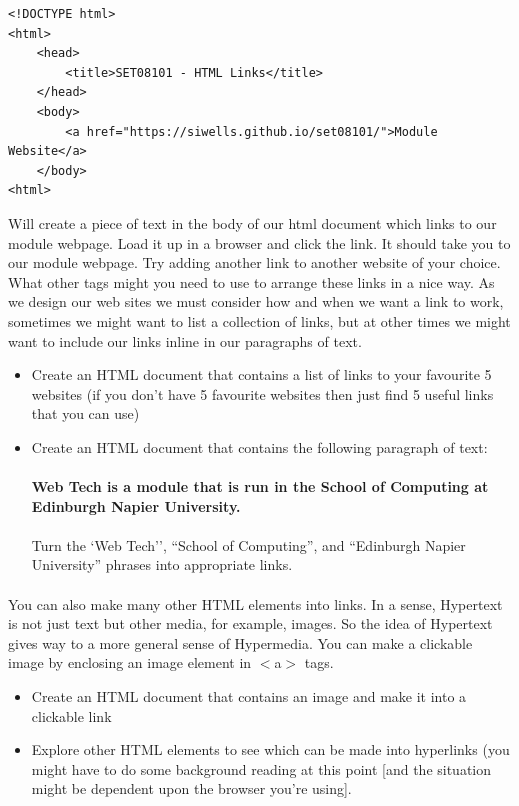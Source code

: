 \documentclass[10pt, a4paper, twosize]{article}
\begin{document}
\begin{lstlisting}
<!DOCTYPE html>
<html>
    <head>
        <title>SET08101 - HTML Links</title>
    </head>
    <body>
        <a href="https://siwells.github.io/set08101/">Module Website</a>        
    </body>
<html>
\end{lstlisting}
Will create a piece of text in the body of our html document which links to our module webpage. Load it up in a browser and click the link. It should take you to our module webpage. Try adding another link to another website of your choice. What other tags might you need to use to arrange these links in a nice way. As we design our web sites we must consider how and when we want a link to work, sometimes we might want to list a collection of links, but at other times we might want to include our links inline in our paragraphs of text.

\begin{itemize}
\item Create an HTML document that contains a list of links to your favourite 5 websites (if you don't have 5 favourite websites then just find 5 useful links that you can use)
\item Create an HTML document that contains the following paragraph of text:\\\\
{\textbf{Web Tech is a module that is run in the School of Computing at Edinburgh Napier University.}}\\\\
Turn the `Web Tech'', ``School of Computing'', and ``Edinburgh Napier University'' phrases into appropriate links.
\end{itemize}

\paragraph{} You can also make many other HTML elements into links. In a sense, Hypertext is not just text but other media, for example, images. So the idea of Hypertext gives way to a more general sense of Hypermedia. You can make a clickable image by enclosing an image element in $<$a$>$ tags.

\begin{itemize}
\item Create an HTML document that contains an image and make it into a clickable link
\item Explore other HTML elements to see which can be made into hyperlinks (you might have to do some background reading at this point [and the situation might be dependent upon the browser you're using].
\end{itemize}
\end{document}
